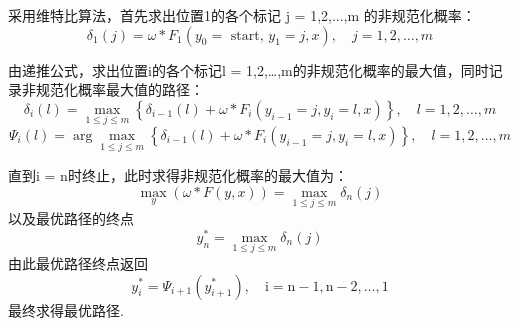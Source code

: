 \documentclass[UTF8,a4paper,AutoFakeBold,AutoFakeSlant]{article}
\begin{document}
采用维特比算法，首先求出位置1的各个标记 j = 1,2,...,m 的非规范化概率：
$$ \delta_{1}(j)=\omega * F_{1}\left(y_{0}=\text { start, } y_{1}=j, x\right), \quad j=1,2, \ldots, m $$

由递推公式，求出位置i的各个标记l = 1,2,…,m的非规范化概率的最大值，同时记录非规范化概率最大值的路径：
$$ \delta_{i}(l)=\max _{1 \leq j \leq m}\left\{\delta_{i-1}(l)+\omega * F_{i}\left(y_{i-1}=j, y_{i}=l, x\right)\right\}, \quad l=1,2, \ldots, m  $$
$$ \Psi_{i}(l)=\arg \max _{1 \leq j \leq m}\left\{\delta_{i-1}(l)+\omega * F_{i}\left(y_{i-1}=j, y_{i}=l, x\right)\right\}, \quad l=1,2, \ldots, m $$

直到i = n时终止，此时求得非规范化概率的最大值为：
$$ \max _{y}(\omega * F(y, x))=\max _{1 \leq j \leq m} \delta_{n}(j) $$
以及最优路径的终点
$$ y_{n}^{*}=\max _{1 \leq j \leq m} \delta_{n}(j) $$
由此最优路径终点返回
$$ y_{i}^{*}=\Psi_{i+1}\left(y_{i+1}^{*}\right), \quad \mathrm{i}=\mathrm{n}-1, \mathrm{n}-2, \ldots, 1 $$
最终求得最优路径.








% 
% 
% 
\end{document}
